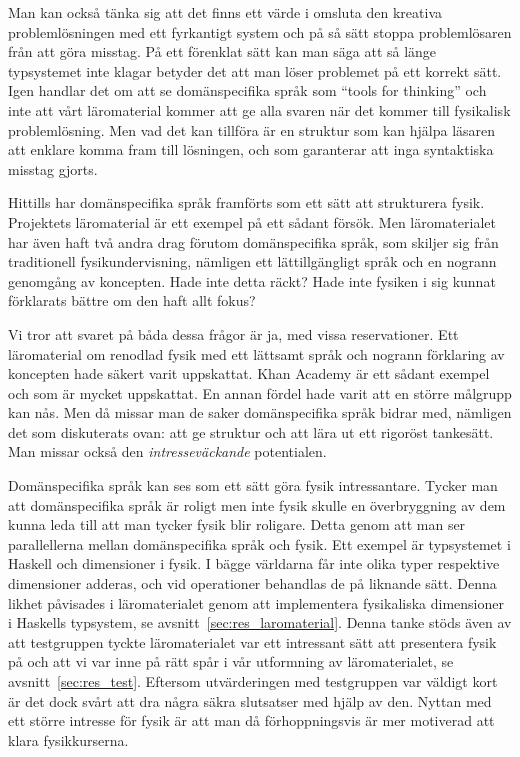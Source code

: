 Man kan också
tänka sig att det finns ett värde i omsluta den kreativa problemlösningen
med ett fyrkantigt system och på så sätt stoppa problemlösaren från att göra
misstag. På ett förenklat sätt kan man säga att så länge typsystemet inte klagar
betyder det att man löser problemet på ett korrekt sätt. Igen handlar det om att se
domänspecifika språk som ``tools for thinking'' och inte att vårt
läromaterial kommer att ge alla svaren när det kommer till fysikalisk
problemlösning. Men vad det kan tillföra är en struktur som kan hjälpa
läsaren att enklare komma fram till lösningen, och som garanterar att inga
syntaktiska misstag gjorts.

Hittills har domänspecifika språk framförts som ett sätt att strukturera fysik.
Projektets läromaterial är ett exempel på ett sådant försök. Men läromaterialet
har även haft två andra drag förutom domänspecifika språk, som skiljer sig från
traditionell fysikundervisning, nämligen ett lättillgängligt språk och en
nogrann genomgång av koncepten. Hade inte detta räckt? Hade inte fysiken i sig
kunnat förklarats bättre om den haft allt fokus?

Vi tror att svaret på båda dessa frågor är ja, med vissa reservationer. Ett
läromaterial om renodlad fysik med ett lättsamt språk och nogrann förklaring av
koncepten hade säkert varit uppskattat. Khan Academy är ett sådant
exempel~\cite{khan} och som är mycket uppskattat. En annan fördel hade varit att en större målgrupp kan nås.
Men då missar man de saker domänspecifika språk bidrar med, nämligen det som
diskuterats ovan: att ge struktur och att lära ut ett rigoröst tankesätt. Man
missar också den \textit{intresseväckande} potentialen.

Domänspecifika språk kan ses som ett sätt göra fysik intressantare. Tycker man
att domänspecifika språk är roligt men inte fysik skulle en överbryggning av dem
kunna leda till att man tycker fysik blir roligare. Detta genom att man ser
parallellerna mellan domänspecifika språk och fysik. Ett exempel är typsystemet i
Haskell och dimensioner i fysik. I bägge världarna får inte olika typer
respektive dimensioner adderas, och vid operationer behandlas de på liknande
sätt. Denna likhet påvisades i läromaterialet genom att implementera fysikaliska
dimensioner i Haskells typsystem, se avsnitt~\ref{sec:res_laromaterial}. Denna
tanke stöds även av att testgruppen tyckte läromaterialet var ett intressant sätt
att presentera fysik på och att vi var inne på rätt spår i vår utformning av
läromaterialet, se avsnitt~\ref{sec:res_test}. Eftersom utvärderingen med
testgruppen var väldigt kort är det dock svårt att dra några säkra slutsatser
med hjälp av den. Nyttan med ett större intresse för fysik är att man
då förhoppningsvis är mer motiverad att klara fysikkurserna.

